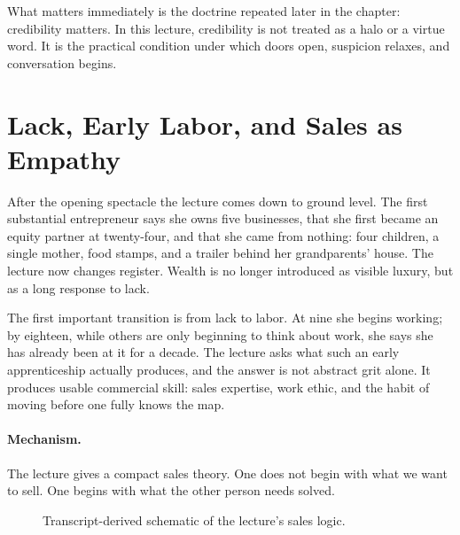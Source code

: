 What matters immediately is the doctrine repeated later in the chapter: credibility matters. In this lecture, credibility is not treated as a halo or a virtue word. It is the practical condition under which doors open, suspicion relaxes, and conversation begins.

\section{Lack, Early Labor, and Sales as Empathy}

After the opening spectacle the lecture comes down to ground level. The first substantial entrepreneur says she owns five businesses, that she first became an equity partner at twenty-four, and that she came from nothing: four children, a single mother, food stamps, and a trailer behind her grandparents' house. The lecture now changes register. Wealth is no longer introduced as visible luxury, but as a long response to lack.

The first important transition is from lack to labor. At nine she begins working; by eighteen, while others are only beginning to think about work, she says she has already been at it for a decade. The lecture asks what such an early apprenticeship actually produces, and the answer is not abstract grit alone. It produces usable commercial skill: sales expertise, work ethic, and the habit of moving before one fully knows the map.

\paragraph{Mechanism.}
The lecture gives a compact sales theory. One does not begin with what we want to sell. One begins with what the other person needs solved.

\begin{figure}
\centering
{}
\caption{Transcript-derived schematic of the lecture's sales logic.}
\end{figure}

